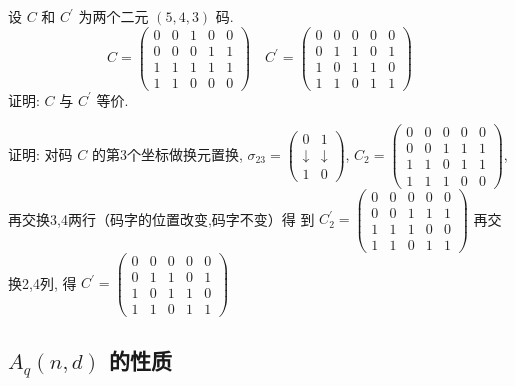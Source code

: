 \begin{example}
 设 $ C $ 和 $ C^{\prime} $ 为两个二元 $ (5,4,3) $ 码.
$$
C=\left(\begin{array}{lllll}
0 & 0 & 1 & 0 & 0 \\
0 & 0 & 0 & 1 & 1 \\
1 & 1 & 1 & 1 & 1 \\
1 & 1 & 0 & 0 & 0
\end{array}\right) \quad C^{\prime}=\left(\begin{array}{lllll}
0 & 0 & 0 & 0 & 0 \\
0 & 1 & 1 & 0 & 1 \\
1 & 0 & 1 & 1 & 0 \\
1 & 1 & 0 & 1 & 1
\end{array}\right)
$$
证明: $ C $ 与 $ C^{\prime} $ 等价.

证明: 对码 $ C $ 的第3个坐标做换元置换, $ \sigma_{23}=\left(\begin{array}{cc}0 & 1 \\ \downarrow & \downarrow \\ 1 & 0\end{array}\right) $,
$
C_{2}=\left(\begin{array}{lllll}
0 & 0 & 0 & 0 & 0 \\
0 & 0 & 1 & 1 & 1 \\
1 & 1 & 0 & 1 & 1 \\
1 & 1 & 1 & 0 & 0
\end{array}\right)
$,
再交换3,4两行（码字的位置改变,码字不变）得
到 $ C_{2}^{\prime}=\left(\begin{array}{lllll}0 & 0 & 0 & 0 & 0 \\ 0 & 0 & 1 & 1 & 1 \\ 1 & 1 & 1 & 0 & 0 \\ 1 & 1 & 0 & 1 & 1\end{array}\right) $
再交换2,4列, 得 $ C^{\prime}=\left(\begin{array}{lllll}0 & 0 & 0 & 0 & 0 \\ 0 & 1 & 1 & 0 & 1 \\ 1 & 0 & 1 & 1 & 0 \\ 1 & 1 & 0 & 1 & 1\end{array}\right) $
\end{example}


 \subsection{$ A_{q}(n, d) $ 的性质}
 
